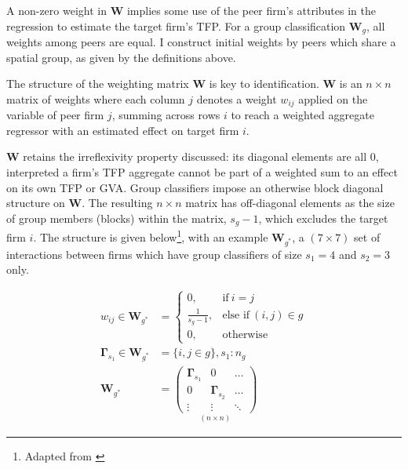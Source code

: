 A non-zero weight in $\mathbf W$ implies some use of the peer firm's attributes
in the regression to estimate the target firm's TFP.
For a group classification $\mathbf W_g$, all weights among peers are equal.
I construct initial weights by peers which share a spatial group,
as given by the definitions above.
\par
The structure of the weighting matrix $\mathbf W$ is key to identification.
$\mathbf W$ is an $n\times n$ matrix of weights where each column $j$ denotes a weight $w_{ij}$
applied on the variable of peer firm $j$, summing across rows $i$
to reach a weighted aggregate regressor
with an estimated effect on target firm $i$.
\par
$\mathbf W$ retains the irreflexivity property discussed: its diagonal elements are all $0$,
interpreted a firm's TFP aggregate cannot be part of a weighted sum to an effect on its own TFP or GVA.
Group classifiers impose an otherwise block diagonal structure on $\mathbf W$.
The resulting $n\times n$ matrix has off-diagonal elements as
the size of group members (blocks) within the matrix, $s_g-1$, which excludes the target firm $i$.
The structure is given
below\footnote{Adapted from \cite{Bramoulle2009}},
with an example $\mathbf W_{g^*}$, a $(7\times 7)$ set of interactions
between firms which have group classifiers of size $s_1=4$ and $s_2=3$ only.

\begin{align*}
    w_{ij}\in \mathbf W_{g^*} &=
        \begin{cases}
            0,              & \text{if}         \ i=j           \\
            \frac1{s_g-1},  & \text{else if}    \ (i,j)\in g    \\
            0,              & \text{otherwise}
        \end{cases}
    \\
    \mathbf \Gamma_{s_1} \in \mathbf W_{g^*}
    &=
    \{ i, j \in g \}, s_1: n_g
    \\
    \mathbf W_{g^*}
    &=
    \underset{(n\times n)}{
        \begin{pmatrix}
            \mathbf \Gamma_{s_1}    &   0                       &   \dots       \\
            0                       &   \mathbf \Gamma_{s_2}    &   \dots       \\
            \vdots                  &   \vdots                  &   \ddots
        \end{pmatrix}
    }
\end{align*}

